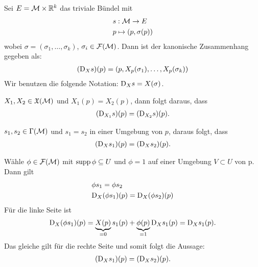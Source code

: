 \begin{bsp}
Sei $E = \mathcal{M} \times \mathbb{R}^k$ das triviale Bündel mit
\begin{align}
&s: \mathcal{M} \to E \\
&p \mapsto (p, \sigma(p))
\end{align}
wobei $\sigma = (\sigma_1, \dots, \sigma_k)$, $\sigma_i \in \mathcal{F}(\mathcal{M})$.
Dann ist der kanonische Zusammenhang gegeben als:
\begin{align}
(\mathrm{D}_X s)(p) = (p, X_p(\sigma_1), \dots, X_p(\sigma_k))
\end{align}
Wir benutzen die folgende Notation: $\mathrm{D}_X s = X(\sigma)$.
\end{bsp}

\begin{lem}
\label{lem:lokalisierung1}
$X_1, X_2 \in \mathfrak{X}(\mathcal{M})$ und $X_1(p) = X_2(p)$,
dann folgt daraus, dass 
\begin{align}
(\mathrm{D}_{X_1} s)(p) = (\mathrm{D}_{X_2} s) (p).
\end{align}

\end{lem}

\begin{lem}
\label{lem:lokalisierung2}
$s_1, s_2 \in \Gamma(\mathcal{M})$ und $s_1 = s_2$ in einer Umgebung von $p$,
daraus folgt, dass
\begin{align}
(\mathrm{D}_{X} s_1)(p) = (\mathrm{D}_{X} s_2) (p).
\end{align}
\end{lem}

\begin{bew}
Wähle $\phi \in \mathcal{F}(\mathcal{M})$ mit $\operatorname{supp} \phi \subseteq U$ und $\phi = 1$ auf einer Umgebung $V \subset U$ von p.
Dann gilt 
\begin{align}
&\phi s_1 = \phi s_2 \\
&\mathrm{D}_X(\phi s_1)(p) = \mathrm{D}_X(\phi s_2)(p)
\end{align}
Für die linke Seite ist
\begin{align}
\mathrm{D}_X(\phi s_1)(p) = \underbrace{X(p)}_{=0} s_1(p) + \underbrace{\phi(p)}_{=1} \mathrm{D}_X s_1(p) = \mathrm{D}_X s_1 (p).
\end{align}
Das gleiche gilt für die rechte Seite und somit folgt die Aussage:
\begin{align}
(\mathrm{D}_{X} s_1)(p) = (\mathrm{D}_{X} s_2) (p).
\end{align}
\end{bew}
